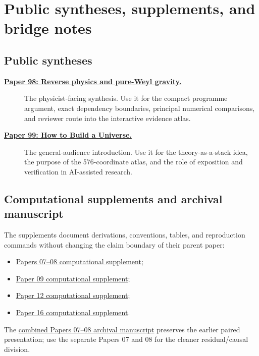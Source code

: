\documentclass[11pt]{article}
\begin{document}
\section{Public syntheses, supplements, and bridge notes}

\subsection{Public syntheses}

\begin{description}
\item[\href{98-physicist-executive-summary.pdf}{\textbf{Paper 98: Reverse
physics and pure-Weyl gravity.}}]
The physicist-facing synthesis.  Use it for the compact programme argument,
exact dependency boundaries, principal numerical comparisons, and reviewer
route into the interactive evidence atlas.

\item[\href{99-how-to-build-a-universe.pdf}{\textbf{Paper 99: How to Build a
Universe.}}]
The general-audience introduction.  Use it for the theory-as-a-stack idea,
the purpose of the 576-coordinate atlas, and the role of exposition and
verification in AI-assisted research.
\end{description}

\subsection{Computational supplements and archival manuscript}

The supplements document derivations, conventions, tables, and reproduction
commands without changing the claim boundary of their parent paper:
\begin{itemize}
\item \href{07-08-conformal-residual-cohomology-computational-supplement.pdf}{Papers
07--08 computational supplement};
\item \href{09-relational-clocks-berger-d-cartan-computational-supplement.pdf}{Paper
09 computational supplement};
\item \href{12-pure-weyl-one-loop-bv-anomaly-computational-supplement.pdf}{Paper
12 computational supplement};
\item \href{16-endpoint-nonselection-computational-supplement.pdf}{Paper 16
computational supplement}.
\end{itemize}
The \href{07-08-conformal-residual-cohomology-archive.pdf}{combined Papers
07--08 archival manuscript} preserves the earlier paired presentation; use
the separate Papers 07 and 08 for the cleaner residual/causal division.
\end{document}
